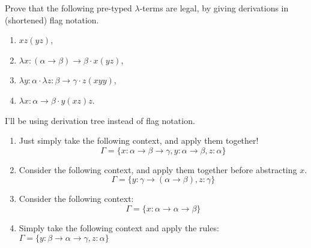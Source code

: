 \begin{problem}{2.10}
    Prove that the following pre-typed $\lambda$-terms are legal, by giving derivations in (shortened) flag notation.
    \begin{enumerate}[label=$(\alph*)$]
    \item $x z (y z)$,
    \item $\lambda x : (\alpha \rightarrow \beta) \rightarrow \beta \cdot x(y z)$,
    \item $\lambda y : \alpha \cdot \lambda z : \beta \rightarrow \gamma \cdot z(x y y)$,
    \item $\lambda x : \alpha \rightarrow \beta \cdot y(x z)z$.
    \end{enumerate}
\end{problem}

\begin{solution}
    I'll be using derivation tree instead of flag notation.
    \begin{enumerate}[label=$(\alph*)$]
        \item Just simply take the following context, and apply them together! $$ \Gamma = \{ x:\alpha \to \beta \to \gamma, y:\alpha \to \beta, z:\alpha \} $$
        \item Consider the following context, and apply them together before abstracting $x$. $$ \Gamma = \{ y:\gamma \to (\alpha \to \beta), z:\gamma \} $$
        \item Consider the following context: $$ \Gamma = \{ x:\alpha \to \alpha \to \beta \} $$
            \begin{prooftree}
            \end{prooftree}
        \item Simply take the following context and apply the rules: $ \Gamma = \{ y : \beta \to \alpha \to \gamma, z : \alpha \} $
    \end{enumerate}
\end{solution}